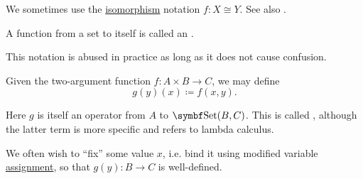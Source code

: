 \begin{definition}
\begin{DefEnum}
    We sometimes use the \hyperref[def:morphism_invertibility/isomorphism]{isomorphism} notation \( f: X \cong Y \). See also .
  \end{DefEnum}
\end{definition}

\begin{definition}\label{def:endofunction}
  A function from a set to itself is called an .
\end{definition}

\begin{definition}\label{def:currying}
  This notation is abused in practice as long as it does not cause confusion.

  Given the two-argument function \( f: A \times B \to C \), we may define
  \begin{equation*}
    g(y)(x) \coloneqq f(x, y).
  \end{equation*}

  Here \( g \) is itself an operator from \( A \) to \( \Cat{Set}(B, C) \). This is called , although the latter term is more specific and refers to lambda calculus.

  We often wish to \enquote{fix} some value \( x \), i.e. bind it using modified variable \hyperref[def:first_order_valuation/variable_assignment]{assignment}, so that \( g(y): B \to C \) is well-defined.
\end{definition}

